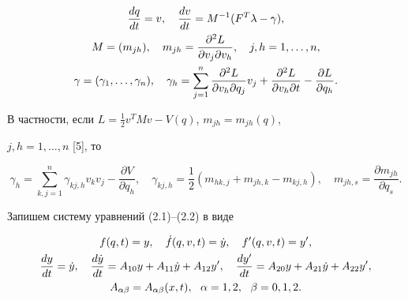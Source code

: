 \begin{gather} 


\frac{d q}{d t}=v,\quad \frac{d v}{d t}=M^{-1}(F^T\lambda-\gamma),\\ 


M=(m_{j h}),\quad m_{j h}=\frac{\partial^2L} 


{\partial v_j\partial v_h},\quad j,h=1,\dotsc,n,\notag \\ 


\gamma=(\gamma_1,\dotsc,\gamma_n),\quad \gamma_h=\sum^n_{j=1} 


\frac{\partial^2L}{\partial v_h\partial q_j}v_j+ 


\frac{\partial^2L}{\partial v_h\partial t}- 


\frac{\partial L}{\partial q_h}.\notag 


\end{gather} 


 


В частности, если $L=\frac{1}{2}v^T M v-V(q)$, $m_{j h}=m_{j h}(q)$, 


$j,h=1,\dotsc,n$ [5], то 


$$ 


\gamma_h=\sum^n_{k,j=1}\gamma_{k j,h}v_k v_j- 


\frac{\partial V}{\partial q_h},\quad 


\gamma_{k j,h}=\frac{1}{2}(m_{h k,j}+m_{j h,k}-m_{k j,h}),\quad 


m_{jh,s}=\frac{\partial m_{j h}}{\partial q_s}. 


$$ 


 


Запишем систему уравнений (2.1)--(2.2) в виде 


\begin{gather} 


f(q,t)=y,\quad \Dot f(q,v,t)=\Dot y,\quad f'(q,v,t)=y',\\ 


% 


\frac{d y}{d t}=\Dot y,\quad \frac{d\Dot y}{d t}=A_{10}y+ 


A_{11}\Dot y+A_{12}y',\quad \frac{d y'}{d t}=A_{20}y+ 


A_{21}\Dot y+A_{22}y', \\ 


A_{\alpha\beta}=A_{\alpha\beta}(x,t),\ \ \alpha=1,2, 


\ \ \beta=0,1,2. \notag 


\end{gather} 


